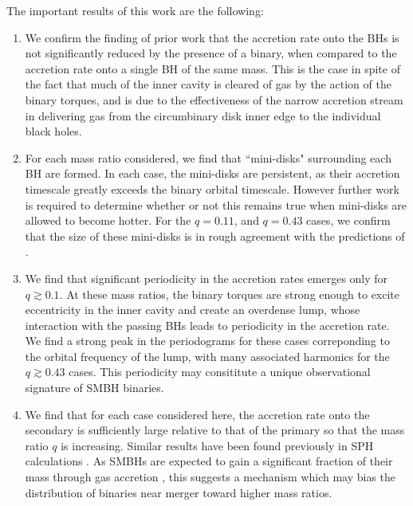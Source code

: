 \documentclass[apj]{emulateapj}
\begin{document}
The important results of this work are the following:
\begin{enumerate}
\item We confirm the finding of prior work \citep{macfadyen08,dorazio13} that the accretion rate onto the BHs is not significantly reduced by the presence of a binary, when compared to the accretion rate onto a single BH of the same mass. This is the case in spite of the fact that much of the inner cavity is cleared of gas by the action of the binary torques, and is due to the effectiveness of the narrow accretion stream in delivering gas from the circumbinary disk inner edge to the individual black holes.
\item For each mass ratio considered, we find that ``mini-disks" surrounding each BH are formed. In each case, the mini-disks are persistent, as their accretion timescale greatly exceeds the binary orbital timescale. However further work is required to determine whether or not this remains true when mini-disks are allowed to become hotter. For the $q=0.11$, and $q=0.43$ cases, we confirm that the size of these mini-disks is in rough agreement with the predictions of \citet{artymowicz94}.
\item We find that significant periodicity in the accretion rates emerges only for $q \gtrsim 0.1$. At these mass ratios, the binary torques are strong enough to excite eccentricity in the inner cavity and create an overdense lump, whose interaction with the passing BHs leads to periodicity in the accretion rate. We find a strong peak in the periodograms for these cases correponding to the orbital frequency of the lump, with many associated harmonics for the $q\gtrsim 0.43$ cases. This periodicity may consititute a unique observational signature of SMBH binaries.
\item We find that for each case considered here, the accretion rate onto the secondary is sufficiently large relative to that of the primary so that the mass ratio $q$ is increasing. Similar results have been found previously in SPH calculations \citep{hayasaki07,cuadra09,roedig11,roedig12}. As SMBHs are expected to gain a significant fraction of their mass through gas accretion \citep{soltan82,yu02,elvis02}, this suggests a mechanism which may bias the distribution of binaries near merger toward higher mass ratios.
\end{enumerate}
\end{document}
